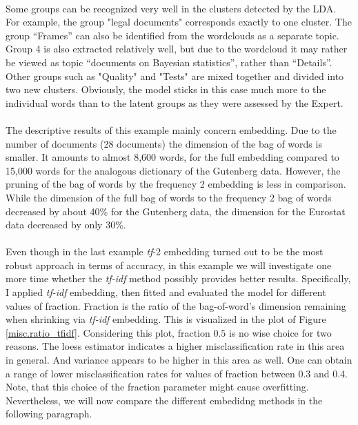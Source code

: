 \documentclass[11pt,a4paper]{article}
\begin{document}
\ \\
Some groups can be recognized very well in the clusters detected by the LDA. For example, the group "legal documents" corresponds exactly to one cluster. The group “Frames” can also be identified from the wordclouds as a separate topic. Group 4 is also extracted relatively well, but due to the wordcloud it may rather be viewed as topic “documents on Bayesian statistics”, rather than “Details”. Other groups such as "Quality" and "Tests" are mixed together and divided into two new clusters. Obviously, the model sticks in this case much more to the individual words than to the latent groups as they were assessed by the Expert.\\
\ \\
The descriptive results of this example mainly concern embedding. Due to the number of documents (28 documents) the dimension of the bag of words is smaller. It amounts to almost 8,600 words, for the full embedding compared to 15,000 words for the analogous dictionary of the Gutenberg data. However, the pruning of the bag of words by the frequency 2 embedding is less in comparison. While the dimension of the full bag of words to the frequency 2 bag of words decreased by about 40\% for the Gutenberg data, the dimension for the Eurostat data decreased by only 30\%.\\
\ \\
Even though in the last example \textit{tf}-2 embedding turned out to be the most robust approach in terms of accuracy, in this example we will investigate one more time whether the \textit{tf-idf} method possibly provides better results. Specifically, I applied \textit{tf-idf} embedding, then fitted and evaluated the model for different values of fraction. Fraction is the ratio of the bag-of-word’s dimension remaining when shrinking via \textit{tf-idf} embedding. This is visualized in the plot of Figure \ref{misc.ratio_tfidf}. Considering this plot, fraction $0.5$ is no wise choice for two reasons. The loess estimator indicates a higher misclassification rate in this area in general. And variance appears to be higher in this area as well. One can obtain a range of lower misclassification rates for values of fraction between 0.3 and 0.4. Note, that this choice of the fraction parameter might cause overfitting. Nevertheless, we will now compare the different embedidng methods in the following paragraph.\\
\end{document}

